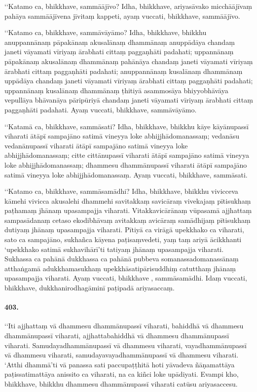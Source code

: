 ‘‘Katamo ca, bhikkhave, sammāājīvo? Idha, bhikkhave, ariyasāvako micchāājīvaṃ pahāya sammāājīvena jīvitaṃ kappeti, ayaṃ vuccati, bhikkhave, sammāājīvo.

‘‘Katamo ca, bhikkhave, sammāvāyāmo? Idha, bhikkhave, bhikkhu anuppannānaṃ pāpakānaṃ akusalānaṃ dhammānaṃ anuppādāya chandaṃ janeti vāyamati vīriyaṃ ārabhati cittaṃ paggaṇhāti padahati; uppannānaṃ pāpakānaṃ akusalānaṃ dhammānaṃ pahānāya chandaṃ janeti vāyamati vīriyaṃ ārabhati cittaṃ paggaṇhāti padahati; anuppannānaṃ kusalānaṃ dhammānaṃ uppādāya chandaṃ janeti vāyamati vīriyaṃ ārabhati cittaṃ paggaṇhāti padahati; uppannānaṃ kusalānaṃ dhammānaṃ ṭhitiyā asammosāya bhiyyobhāvāya vepullāya bhāvanāya pāripūriyā chandaṃ janeti vāyamati vīriyaṃ ārabhati cittaṃ paggaṇhāti padahati. Ayaṃ vuccati, bhikkhave, sammāvāyāmo.

‘‘Katamā ca, bhikkhave, sammāsati? Idha, bhikkhave, bhikkhu kāye kāyānupassī viharati ātāpī sampajāno satimā vineyya loke abhijjhādomanassaṃ; vedanāsu vedanānupassī viharati ātāpī sampajāno satimā vineyya loke abhijjhādomanassaṃ; citte cittānupassī viharati ātāpī sampajāno satimā vineyya loke abhijjhādomanassaṃ; dhammesu dhammānupassī viharati ātāpī sampajāno satimā vineyya loke abhijjhādomanassaṃ. Ayaṃ vuccati, bhikkhave, sammāsati.

‘‘Katamo ca, bhikkhave, sammāsamādhi? Idha, bhikkhave, bhikkhu vivicceva kāmehi vivicca akusalehi dhammehi savitakkaṃ savicāraṃ vivekajaṃ pītisukhaṃ paṭhamaṃ jhānaṃ upasampajja viharati. Vitakkavicārānaṃ vūpasamā ajjhattaṃ sampasādanaṃ cetaso ekodibhāvaṃ avitakkaṃ avicāraṃ samādhijaṃ pītisukhaṃ dutiyaṃ jhānaṃ upasampajja viharati. Pītiyā ca virāgā upekkhako ca viharati, sato ca sampajāno, sukhañca kāyena paṭisaṃvedeti, yaṃ taṃ ariyā ācikkhanti ‘upekkhako satimā sukhavihārī’ti tatiyaṃ jhānaṃ upasampajja viharati. Sukhassa ca pahānā dukkhassa ca pahānā pubbeva somanassadomanassānaṃ atthaṅgamā adukkhamasukhaṃ upekkhāsatipārisuddhiṃ catutthaṃ jhānaṃ upasampajja viharati. Ayaṃ vuccati, bhikkhave , sammāsamādhi. Idaṃ vuccati, bhikkhave, dukkhanirodhagāminī paṭipadā ariyasaccaṃ.

\paragraph{403.} ‘‘Iti ajjhattaṃ vā dhammesu dhammānupassī viharati, bahiddhā vā dhammesu dhammānupassī viharati, ajjhattabahiddhā vā dhammesu dhammānupassī viharati. Samudayadhammānupassī vā dhammesu viharati, vayadhammānupassī vā dhammesu viharati, samudayavayadhammānupassī vā dhammesu viharati. ‘Atthi dhammā’ti vā panassa sati paccupaṭṭhitā hoti yāvadeva ñāṇamattāya paṭissatimattāya anissito ca viharati, na ca kiñci loke upādiyati. Evampi kho, bhikkhave, bhikkhu dhammesu dhammānupassī viharati catūsu ariyasaccesu.

